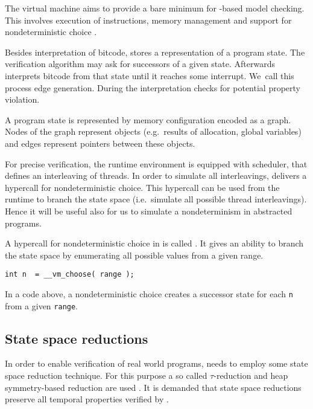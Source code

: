The \DIVINE virtual machine aims to provide a bare mini\-mum for \LLVM-based model
checking. This involves execution of instructions, memory management and support
for nondeterministic choice \cite{RockaiCB17}.

Besides interpretation of \LLVM bitcode, \DIVM stores a representation of a
program state. The verification algorithm may ask \DIVM for successors of a
given state. Afterwards \DIVM interprets \LLVM bitcode from that state until it
reaches some interrupt. We~call this process edge generation. During
the interpretation \DIVM checks for potential property violation.

A program state is represented by memory configuration encoded as a graph.
Nodes of the graph represent objects (e.g.~results of allocation, global
variables) and edges represent pointers between these objects.

For precise verification, the runtime environment is equipped with scheduler,
that defines an interleaving of threads. In order to simulate all interleavings,
\DIVM delivers a hypercall for nondeterministic choice. This hypercall can be
used from the runtime to branch the state space (i.e.~simulate all possible
thread interleavings). Hence it will be useful also
for us to simulate a nondeterminism in abstracted programs.

\begin{example}
A hypercall for nondeterministic choice in \DIVM is called .
It gives an ability to branch the state space by enumerating all possible values
from a given range.

\begin{verbatim}
int n  = __vm_choose( range );
\end{verbatim}
\noindent
In a code above, a nondeterministic choice creates a successor state for each
\texttt{n} from a given \texttt{range}.

\end{example}
\subsection{State space reductions}

In order to enable verification of real world programs, \DIVINE needs to employ
some state space reduction technique. For this purpose a so called
$\tau$-reduction and heap symmetry-based reduction are used \cite{Rockai13,
RockaiCB17}.  It is
demanded that state space reductions preserve all temporal properties
verified by \DIVINE.

